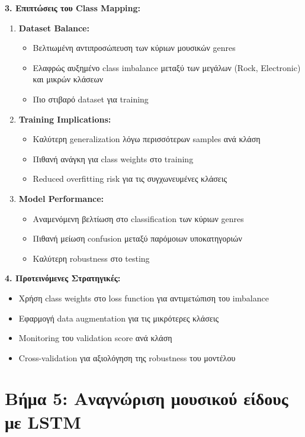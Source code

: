 \documentclass[a4paper,12pt]{article}
\begin{document}
\textbf{3. Επιπτώσεις του Class Mapping:}
\begin{enumerate}
    \item \textbf{Dataset Balance:}
          \begin{itemize}
              \item Βελτιωμένη αντιπροσώπευση των κύριων μουσικών genres
              \item Ελαφρώς αυξημένο class imbalance μεταξύ των μεγάλων (Rock, Electronic) και μικρών κλάσεων
              \item Πιο στιβαρό dataset για training
          \end{itemize}

    \item \textbf{Training Implications:}
          \begin{itemize}
              \item Καλύτερη generalization λόγω περισσότερων samples ανά κλάση
              \item Πιθανή ανάγκη για class weights στο training
              \item Reduced overfitting risk για τις συγχωνευμένες κλάσεις
          \end{itemize}

    \item \textbf{Model Performance:}
          \begin{itemize}
              \item Αναμενόμενη βελτίωση στο classification των κύριων genres
              \item Πιθανή μείωση confusion μεταξύ παρόμοιων υποκατηγοριών
              \item Καλύτερη robustness στο testing
          \end{itemize}
\end{enumerate}

\textbf{4. Προτεινόμενες Στρατηγικές:}
\begin{itemize}
    \item Χρήση class weights στο loss function για αντιμετώπιση του imbalance
    \item Εφαρμογή data augmentation για τις μικρότερες κλάσεις
    \item Monitoring του validation score ανά κλάση
    \item Cross-validation για αξιολόγηση της robustness του μοντέλου
\end{itemize}

\section*{Βήμα 5: Αναγνώριση μουσικού είδους με LSTM}
\end{document}
